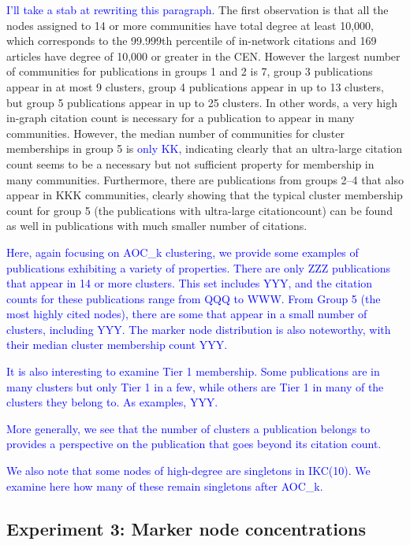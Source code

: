 \documentclass[12pt, oneside]{article}   	%
\begin{document}
\textcolor{blue}{I'll take a stab at rewriting this paragraph}.
The first observation is that all the nodes assigned to 14 or more communities have total degree at least 10,000, which corresponds to the 99.999th percentile of in-network citations and 169 articles have degree of 10,000 or greater in the CEN. 
However the largest number of communities for publications in groups 1 and 2 is 7, group 3 publications appear in at most 9 clusters, group 4 publications appear in up to 13 clusters, 
but group 5 publications appear in up to 25 clusters. In other words, a very high in-graph citation count is necessary  for a publication to appear in many communities. However, the median number of communities for cluster memberships in group 5 is \textcolor{blue}{only KK}, indicating clearly that  an ultra-large citation count seems to be a necessary but not sufficient property for membership in many communities. Furthermore, there are publications from groups 2--4 that also appear in KKK communities, clearly showing that the typical cluster membership count for group 5 (the publications with ultra-large citationcount) can be found as well in publications with much smaller number of citations.

\textcolor{blue}{
Here, again focusing on AOC\_k clustering, we provide some examples
of publications exhibiting a variety of properties.
There are only ZZZ  publications that appear in 14 or more
clusters.  This set includes YYY, and the citation counts for
these publications range from QQQ to WWW.
From Group 5 (the most highly cited nodes), there are some that
appear in a small number of clusters, 
including YYY.
The marker node distribution is also noteworthy, with their
median cluster membership count YYY.
}

\textcolor{blue}{It is also interesting to examine Tier 1 membership.
Some publications are in many clusters but only Tier 1 in a few,
while others are Tier 1 in many of the clusters they belong to.
As examples, YYY.}

\textcolor{blue}{More generally, we see that the number of
clusters a publication belongs to provides a perspective on the publication
that goes beyond its citation count.}


\textcolor{blue}{
We also note that some nodes of high-degree are singletons in IKC(10).
We examine here how many of these remain singletons after
 AOC\_k.
}

\subsection{Experiment 3: Marker node concentrations}
\end{document}
